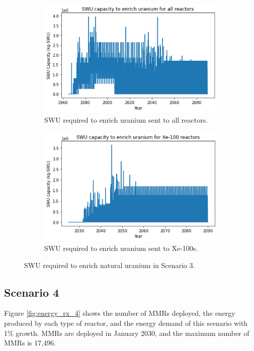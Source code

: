 \begin{figure}
    \centering
    \begin{subfigure}{0.5\textwidth}
        \centering
        \includegraphics[scale=0.5]{../figures/totalswu_scenarios_3.png}
        \caption{\gls{SWU} required to enrich uranium sent to all reactors.}
        \label{fig:totalswu_3}
    \end{subfigure}
    \hspace{0.8cm}
    \begin{subfigure}{0.5\textwidth}
        \centering
        \includegraphics[scale=0.5]{../figures/haleuSWU_scenarios_3.png}
        \caption{\gls{SWU} required to enrich uranium sent to Xe-100s.}
        \label{fig:haleuswu_3}
    \end{subfigure}
    \caption{\gls{SWU} required to enrich natural uranium in Scenario 3.}
    \label{fig:swu_3}
\end{figure}

\subsection{Scenario 4}
Figure \ref{fig:energy_rx_4} shows the number of \glspl{MMR} deployed, the
energy produced by each type of reactor, and the energy demand of this
scenario with 1\% growth. \glspl{MMR} are deployed in January 2030, and the maximum 
number of \glspl{MMR} is 17,496. 


